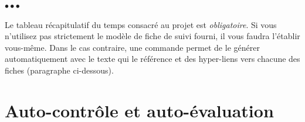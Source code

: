 \documentclass[11pt, french, screen, research-development]{report-rd-info}
\newenvironment{explanation}
{\color{blue}
 \begin{list}{}{\hspace{0.2\textwidth}\color{blue}}\item $\bullet\bullet\bullet$
}
{\end{list}}
\begin{document}
\begin{fichesuivi}{}{}

   \begin{travaileffectue}
   \end{travaileffectue}

   \begin{travailnoneffectue}
   \end{travailnoneffectue}

   \begin{echange}
   \end{echange}

   \begin{planification}
   \end{planification}
\end{fichesuivi}

\begin{fichesuivi}{}{}

   \begin{travaileffectue}
   \end{travaileffectue}

   \begin{travailnoneffectue}
   \end{travailnoneffectue}

   \begin{echange}
   \end{echange}

   \begin{planification}
   \end{planification}
\end{fichesuivi}

\begin{explanation}
   Le tableau récapitulatif du temps consacré au projet est \emph{obligatoire}.
   Si vous n'utilisez pas strictement le modèle de fiche de suivi fourni, il vous faudra l'établir vous-même.
   Dans le cas contraire, une commande permet de le générer automatiquement avec le texte qui le référence et des hyper-liens vers chacune des fiches (paragraphe ci-dessous).
\end{explanation}

\printweeksummary

\chapter{Auto-contrôle et auto-évaluation}
\end{document}
